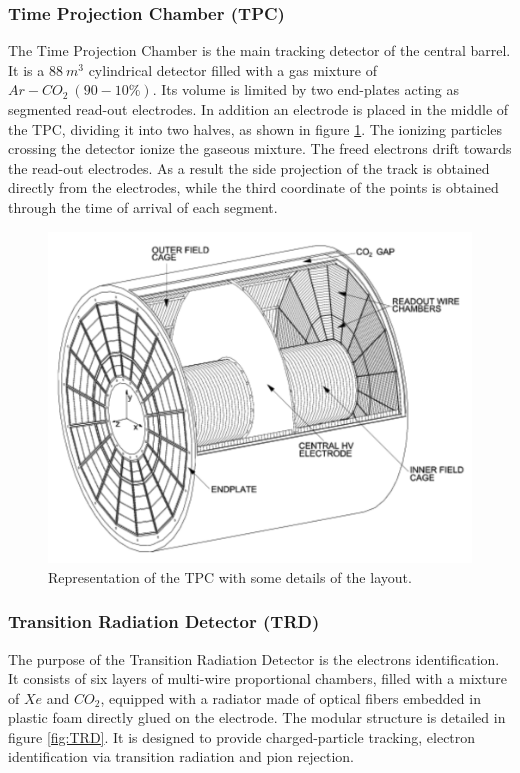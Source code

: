 \subsubsection{Time Projection Chamber (TPC)}
The Time Projection Chamber is the main tracking detector of the central barrel.
It is a $88\ m^3$ cylindrical detector filled with a gas mixture of $Ar-CO_2\ (90-10 \% )$.
Its volume is limited by two end-plates acting as segmented read-out electrodes. 
In addition an electrode is placed in the middle of the TPC, dividing it into two halves, as shown in figure \ref{fig:TPC}.
The ionizing particles crossing the detector ionize the gaseous mixture.
The freed electrons drift towards the read-out electrodes.
As a result the side projection of the track is obtained directly from the electrodes, while the third coordinate of the points is obtained through the time of arrival of each segment.

\begin{figure}[!h]
\begin{center}
\includegraphics[width=0.7\linewidth]{Chapters/Introduction/Figs/tpc.pdf}
\caption{Representation of the TPC with some details of the layout.}
\label{fig:TPC}
\end{center}
\end{figure}

\subsubsection{Transition Radiation Detector (TRD)}
The purpose of the Transition Radiation Detector is the electrons identification.
It consists of six layers of multi-wire proportional chambers, filled with a mixture of $Xe$ and $CO_2$, equipped with a radiator made of optical fibers embedded in plastic foam directly glued on the electrode.
The modular structure is detailed in figure \ref{fig:TRD}.
It is designed to provide charged-particle tracking, electron identification via transition radiation and pion rejection. 

